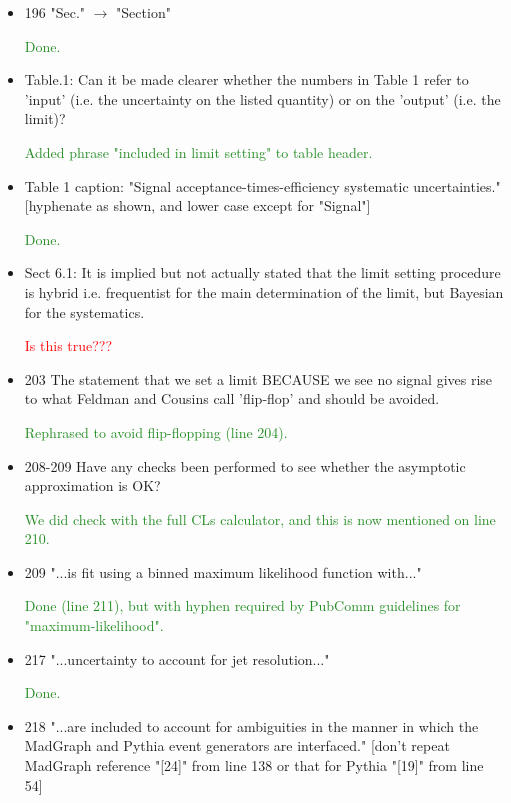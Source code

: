 \documentclass[paper=a4, fontsize=11pt]{scrartcl}
\begin{document}
\begin{itemize}
\item 196 "Sec." $\rightarrow$  "Section"

\textcolor{ForestGreen}{Done.}

\item Table.1:
Can it be made clearer whether the numbers in Table 1 refer to 'input'
(i.e. the uncertainty on the listed
quantity) or on the 'output' (i.e. the limit)?

\textcolor{ForestGreen}{Added phrase "included in limit setting" to table header.}

\item Table 1 caption:
 "Signal acceptance-times-efficiency systematic uncertainties."
 [hyphenate as shown, and lower case except for "Signal"]
 
\textcolor{ForestGreen}{Done.}

\item Sect 6.1:
It is implied but not actually stated that the limit setting procedure is
hybrid i.e. frequentist for the main
determination of the limit, but Bayesian for the systematics.

\textcolor{Red}{Is this true???}

\item 203 The statement that we set a limit BECAUSE we see no signal gives rise
to what Feldman and Cousins call
'flip-flop' and should be avoided.

\textcolor{ForestGreen}{Rephrased to avoid flip-flopping (line 204).}

\item 208-209 Have any checks been performed to see whether the asymptotic
approximation is OK?

\textcolor{ForestGreen}{We did check with the full CLs calculator,
and this is now mentioned on line 210.}

\item 209 "...is fit using a binned maximum likelihood function with..."

\textcolor{ForestGreen}{Done (line 211), but with hyphen required by PubComm guidelines
for "maximum-likelihood".}

\item 217 "...uncertainty to account for jet resolution..."

\textcolor{ForestGreen}{Done.}

\item 218 "...are included to account for ambiguities in the manner in
 which the MadGraph and Pythia event generators are interfaced."
 [don't repeat MadGraph reference "[24]" from line 138 or that
 for Pythia "[19]" from line 54]
 

\end{itemize}
\end{document}
